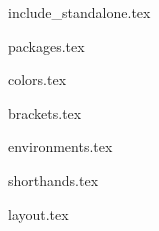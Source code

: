 
{include_standalone.tex}

{packages.tex}


{colors.tex}


{brackets.tex}

{environments.tex}

{shorthands.tex}


{layout.tex}




